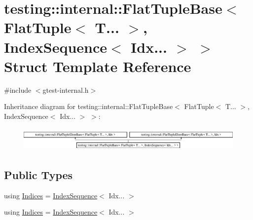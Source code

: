 \hypertarget{structtesting_1_1internal_1_1_flat_tuple_base_3_01_flat_tuple_3_01_t_8_8_8_01_4_00_01_index_sequence_3_01_idx_8_8_8_01_4_01_4}{}\section{testing\+::internal\+::Flat\+Tuple\+Base$<$ Flat\+Tuple$<$ T... $>$, Index\+Sequence$<$ Idx... $>$ $>$ Struct Template Reference}
\label{structtesting_1_1internal_1_1_flat_tuple_base_3_01_flat_tuple_3_01_t_8_8_8_01_4_00_01_index_sequence_3_01_idx_8_8_8_01_4_01_4}


{\ttfamily \#include $<$gtest-\/internal.\+h$>$}

Inheritance diagram for testing\+::internal\+::Flat\+Tuple\+Base$<$ Flat\+Tuple$<$ T... $>$, Index\+Sequence$<$ Idx... $>$ $>$\+:\begin{figure}[H]
\begin{center}
\leavevmode
\includegraphics[height=1.228070cm]{dc/d93/structtesting_1_1internal_1_1_flat_tuple_base_3_01_flat_tuple_3_01_t_8_8_8_01_4_00_01_index_sequence_3_01_idx_8_8_8_01_4_01_4}
\end{center}
\end{figure}
\subsection*{Public Types}
\begin{DoxyCompactItemize}
\item 
using \mbox{\hyperlink{structtesting_1_1internal_1_1_flat_tuple_base_3_01_flat_tuple_3_01_t_8_8_8_01_4_00_01_index_sequence_3_01_idx_8_8_8_01_4_01_4_ada1941ebde1ec1c844b72970e0ccb304}{Indices}} = \mbox{\hyperlink{structtesting_1_1internal_1_1_index_sequence}{Index\+Sequence}}$<$ Idx... $>$
\item 
using \mbox{\hyperlink{structtesting_1_1internal_1_1_flat_tuple_base_3_01_flat_tuple_3_01_t_8_8_8_01_4_00_01_index_sequence_3_01_idx_8_8_8_01_4_01_4_ada1941ebde1ec1c844b72970e0ccb304}{Indices}} = \mbox{\hyperlink{structtesting_1_1internal_1_1_index_sequence}{Index\+Sequence}}$<$ Idx... $>$
\end{DoxyCompactItemize}
